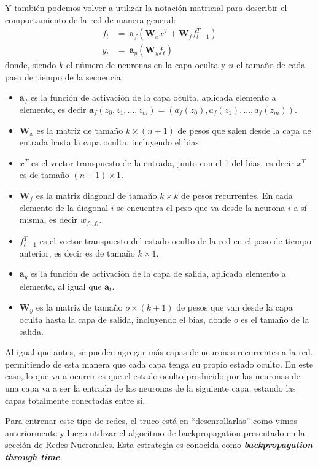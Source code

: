 \documentclass[../../main.tex]{subfiles}
\begin{document}
Y también podemos volver a utilizar la notación matricial para describir el comportamiento
de la red de manera general:
\begin{align*}
    f_t &=\ \bm{a}_f \left( \mathbf{W}_x x^T + \mathbf{W}_f f_{t-1}^T \right) \\
    y_t &=\ \bm{a}_y \left( \mathbf{W}_y f_t \right)
\end{align*}
donde, siendo \(k\) el número de neuronas en la capa oculta y \(n\) el tamaño de cada
paso de tiempo de la secuencia:
\begin{itemize}[itemsep=0.05cm]
    \item \(\bm{a}_f\) es la función de activación de la capa oculta, aplicada elemento a
    elemento, es decir \(\bm{a}_f(z_0, z_1, ..., z_m) = (a_f(z_0), a_f(z_1), ...,
    a_f(z_m))\).
    \item \(\mathbf{W}_x\) es la matriz de tamaño \(k \times (n+1)\) de pesos que salen
    desde la capa de entrada hasta la capa oculta, incluyendo el bias.
    \item \(x^T\) es el vector transpuesto de la entrada, junto con el 1 del bias,
    es decir \(x^T\) es de tamaño \((n+1) \times 1\).
    \item \(\mathbf{W}_f\) es la matriz diagonal de tamaño \(k \times k\) de pesos
    recurrentes. En cada elemento de la diagonal \(i\) se encuentra el peso que va desde
    la neurona \(i\) a sí misma, es decir \(w_{f_i, f_i}\).
    \item \(f_{t-1}^T\) es el vector transpuesto del estado oculto de la red en el paso de
    tiempo anterior, es decir es de tamaño \(k \times 1\).
    \item \(\bm{a}_y\) es la función de activación de la capa de salida, aplicada elemento a
    elemento, al igual que \(\bm{a}_t\).
    \item \(\mathbf{W}_y\) es la matriz de tamaño \(o \times (k+1)\) de pesos que van
    desde la capa oculta hasta la capa de salida, incluyendo el bias, donde \(o\) es el
    tamaño de la salida.
\end{itemize}

Al igual que antes, se pueden agregar más capas de neuronas recurrentes a la red,
permitiendo de esta manera que cada capa tenga su propio estado oculto. En este caso, lo
que va a ocurrir es que el estado oculto producido por las neuronas de una capa va a ser
la entrada de las neuronas de la siguiente capa, estando las capas totalmente conectadas
entre sí.

Para entrenar este tipo de redes, el truco está en ``desenrollarlas'' como vimos
anteriormente y luego utilizar el algoritmo de backpropagation presentado en la sección de
Redes Nueronales. Esta estrategia es conocida como \textbf{\textit{backpropagation through
time}}.
\end{document}
